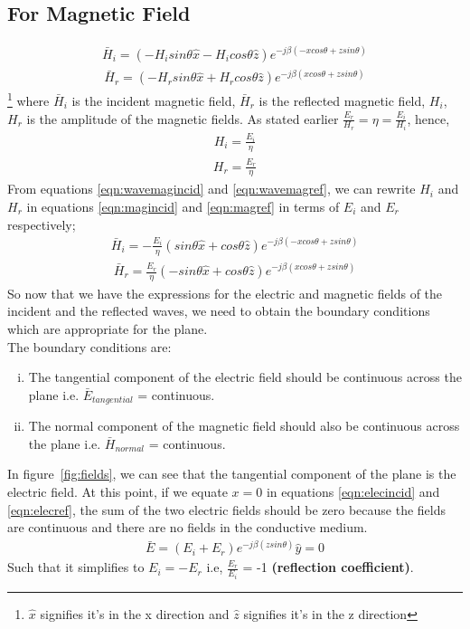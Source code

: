 \subsection{For Magnetic Field}
\begin{align}
\bar{H}_i = (-H_i sin\theta \hat{x} - H_i cos\theta \hat{z}) e ^{-j\beta( -xcos\theta + zsin\theta)}
\label{eqn:magincid}
\end{align}
\begin{align}
\bar{H}_r = (-H_r sin\theta \hat{x} + H_r cos\theta \hat{z}) e ^{-j\beta( xcos\theta + zsin\theta)}
\label{eqn:magref}
\end{align}\footnote{$\hat{x}$ signifies it's in the x direction and $\hat{z}$ signifies it's in the z direction}
where $\bar{H}_i$ is the incident magnetic field, $\bar{H}_r$ is the reflected magnetic field, $H_i$, $H_r$ is the amplitude of the magnetic fields. As stated earlier $\frac{E_r}{H_r} = \eta = \frac{E_i}{H_i}$, hence, 
\begin{align}
H_i = \frac{E_i}{\eta}
\label{eqn:wavemagincid}
\end{align}
\begin{align}
H_r = \frac{E_r}{\eta}
\label{eqn:wavemagref}
\end{align}
From equations \eqref{eqn:wavemagincid} and \eqref{eqn:wavemagref}, we can rewrite $H_i$ and $H_r$ in equations \eqref{eqn:magincid} and \eqref{eqn:magref} in terms of $E_i$ and $E_r$ respectively;
\begin{align}
\bar{H}_i = - \frac{E_i}{\eta} (sin\theta \hat{x} + cos\theta \hat{z})e^{-j\beta (-xcos\theta + zsin\theta)}
\end{align}
\begin{align}
\bar{H}_r =  \frac{E_r}{\eta} (-sin\theta \hat{x} + cos\theta \hat{z})e^{-j\beta (xcos\theta + zsin\theta)}
\end{align}
So now that we have the expressions for the electric and magnetic fields of the incident and the reflected waves, we need to obtain the boundary conditions which are appropriate for the plane.\\ 
The boundary conditions are:
\begin{enumerate}[(i)]
\item The tangential component of the electric field should be continuous across the plane i.e. $\bar{E}_{tangential}$ = continuous.
\item The normal component of the magnetic field should also be continuous across the plane i.e. $\bar{H}_{normal}$ = continuous.
\end{enumerate} 
In figure~\ref{fig:fields}, we can see that the tangential component of the plane is the electric field. At this point, if we equate $x = 0$ in equations \ref{eqn:elecincid} and \ref{eqn:elecref}, the sum of the two electric fields should be zero because the fields are continuous and there are no fields in the conductive medium.
\begin{align}
\bar{E} = (E_i + E_r) e^{-j\beta(zsin\theta) }\hat{y} = 0
\end{align}
Such that it simplifies to $E_i = - E_r$ i.e, $\frac{E_r}{E_i}$ = -1 \textbf{(reflection coefficient)}. 
 
